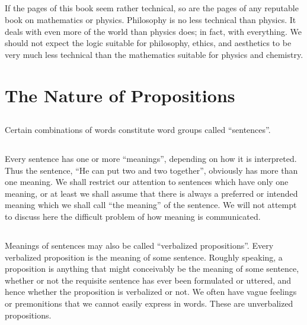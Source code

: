 \documentclass{book}
\begin{document}
\subsection{}
\label{sec:1.7}

If the pages of this book seem rather technical, so are the pages of any reputable book on mathematics or physics.  Philosophy is no less technical than physics.  It deals with even more of the world than physics does; in fact, with everything.  We should not expect the logic suitable for philosophy, ethics, and aesthetics to be very much less technical than the mathematics suitable for physics and chemistry.

\section{The Nature of Propositions}
\label{sec:2}

\subsection{}
\label{sec:2.1}

Certain combinations of words constitute word groups called “sentences”.

\subsection{}
\label{sec:2.2}

Every sentence has one or more “meanings”, depending on how it is interpreted.  Thus the sentence, “He can put two and two together”, obviously has more than one meaning.  We shall restrict our attention to sentences which have only one meaning, or at least we shall assume that there is always a preferred or intended meaning which we shall call “the meaning” of the sentence.  We will not attempt to discuss here the difficult problem of how meaning is communicated.

\subsection{}
\label{sec:2.3}

Meanings of sentences may also be called “verbalized propositions”.  Every verbalized proposition is the meaning of some sentence.  Roughly speaking, a proposition is anything that might conceivably be the meaning of some sentence, whether or not the requisite sentence has ever been formulated or uttered, and hence whether the proposition is verbalized or not.  We often have vague feelings or premonitions that we cannot easily express in words.  These are unverbalized propositions.
\end{document}
